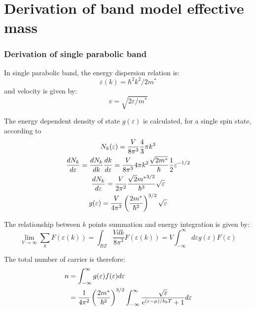 \documentclass{article}
\begin{document}
\part{Derivation of band model effective mass}

\section{Derivation of single parabolic band}
In single parabolic band, the energy dispersion relation is:
\begin{equation}
    \varepsilon(k) = \hbar^2 k^2 / 2m^*
\end{equation}
and velocity is given by:
\begin{equation}
    v =\sqrt{2\varepsilon/m^* }
\end{equation}

The energy dependent density of state $g(\varepsilon)$ is calculated, for a single spin state,
according to
\begin{gather}
    N_k(\varepsilon) = \frac{V}{8\pi^3} \frac{4}{3} \pi k^3 \notag \\
    \frac{dN_k}{d\varepsilon} = \frac{dN_k}{dk} \frac{dk}{d\varepsilon} 
            = \frac{V}{8\pi^3} 4\pi k^2 \frac{\sqrt{2m^*}}{\hbar} \frac{1}{2} \varepsilon^{-1/2} \\
    \frac{dN_k}{d\varepsilon} = \frac{V}{2\pi^2} \frac{\sqrt{2}{m^*}^{3/2}}{\hbar^3} \sqrt{\varepsilon } \\
    g(\varepsilon) = \frac{V}{4\pi^2} \left( \frac{2m^*}{\hbar^2} \right)^{3/2} \sqrt{\varepsilon }
\end{gather}

The relationship between $k$ points summation and energy integration is given by:
\begin{equation}
    \lim_{V \to \infty } \sum_k F(\varepsilon(k)) = \int_{BZ} \frac{Vdk}{8\pi^3}  F(\varepsilon(k)) 
        =V \int_{-\infty}^{\infty} d\varepsilon g(\varepsilon)F(\varepsilon)
\end{equation}

The total number of carrier is therefore:
\begin{align}
    n &= \int_{-\infty}^{\infty} g(\varepsilon)f(\varepsilon) d\varepsilon \notag \\
      &= \frac{1}{4\pi^2} \left( \frac{2m^*}{\hbar^2} \right)^{3/2} \int_{-\infty}^{\infty} \frac{\sqrt{\varepsilon}}{e^{(\varepsilon - \mu)/k_b T}+1} d\varepsilon
\end{align}
\end{document}
